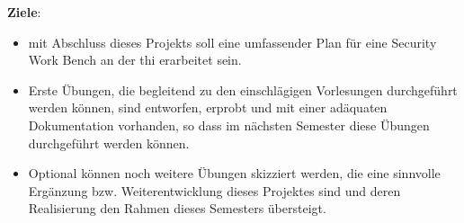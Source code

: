 \textbf{Ziele}:\newline
\begin{itemize}
\item mit Abschluss dieses Projekts soll eine umfassender Plan für eine Security Work Bench an der thi erarbeitet sein.
\item Erste Übungen, die begleitend zu den einschlägigen Vorlesungen durchgeführt werden können, sind entworfen, erprobt und mit einer adäquaten Dokumentation vorhanden, so dass im nächsten Semester diese Übungen durchgeführt werden können.
\item Optional können noch weitere Übungen skizziert werden, die eine sinnvolle Ergänzung bzw. Weiterentwicklung dieses Projektes sind und deren Realisierung den Rahmen dieses Semesters übersteigt.
\end{itemize}